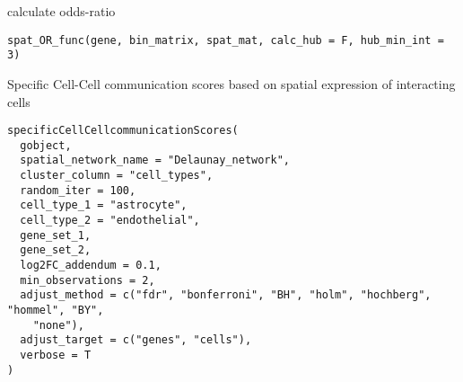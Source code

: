 \documentclass[a4paper]{book}
\begin{document}
%
\begin{Description}\relax
calculate odds-ratio
\end{Description}
%
\begin{Usage}
\begin{verbatim}
spat_OR_func(gene, bin_matrix, spat_mat, calc_hub = F, hub_min_int = 3)
\end{verbatim}
\end{Usage}
%
\begin{Description}\relax
Specific Cell-Cell communication scores based on spatial expression of interacting cells
\end{Description}
%
\begin{Usage}
\begin{verbatim}
specificCellCellcommunicationScores(
  gobject,
  spatial_network_name = "Delaunay_network",
  cluster_column = "cell_types",
  random_iter = 100,
  cell_type_1 = "astrocyte",
  cell_type_2 = "endothelial",
  gene_set_1,
  gene_set_2,
  log2FC_addendum = 0.1,
  min_observations = 2,
  adjust_method = c("fdr", "bonferroni", "BH", "holm", "hochberg", "hommel", "BY",
    "none"),
  adjust_target = c("genes", "cells"),
  verbose = T
)
\end{verbatim}
\end{Usage}
%
\end{document}

